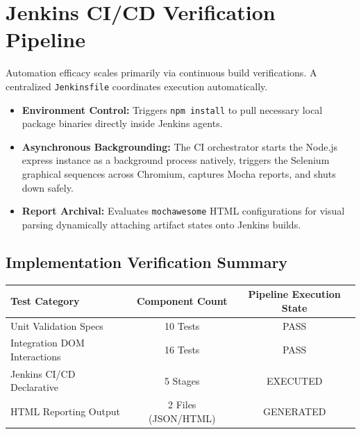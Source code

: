 \documentclass[11pt, a4paper]{article}
\begin{document}
\section{Jenkins CI/CD Verification Pipeline}
Automation efficacy scales primarily via continuous build verifications. A centralized \texttt{Jenkinsfile} coordinates execution automatically. 

\begin{itemize}
    \item \textbf{Environment Control:} Triggers \texttt{npm install} to pull necessary local package binaries directly inside Jenkins agents.
    \item \textbf{Asynchronous Backgrounding:} The CI orchestrator starts the Node.js express instance as a background process natively, triggers the Selenium graphical sequences across Chromium, captures Mocha reports, and shuts down safely.
    \item \textbf{Report Archival:} Evaluates \texttt{mochawesome} HTML configurations for visual parsing dynamically attaching artifact states onto Jenkins builds.
\end{itemize}

\vspace{0.5cm}

\subsection*{Implementation Verification Summary}

\vspace{0.3cm}
\begin{center}
\renewcommand{\arraystretch}{1.3} %
\begin{tabularx}{\textwidth}{@{} l c c @{}} %
\toprule
\textbf{Test Category} & \textbf{Component Count} & \textbf{Pipeline Execution State} \\ 
\midrule
Unit Validation Specs & 10 Tests & PASS \\ 
Integration DOM Interactions & 16 Tests & PASS \\ 
Jenkins CI/CD Declarative & 5 Stages & EXECUTED \\ 
HTML Reporting Output & 2 Files (JSON/HTML) & GENERATED \\ 
\bottomrule
\end{tabularx}
\end{center}
\end{document}
